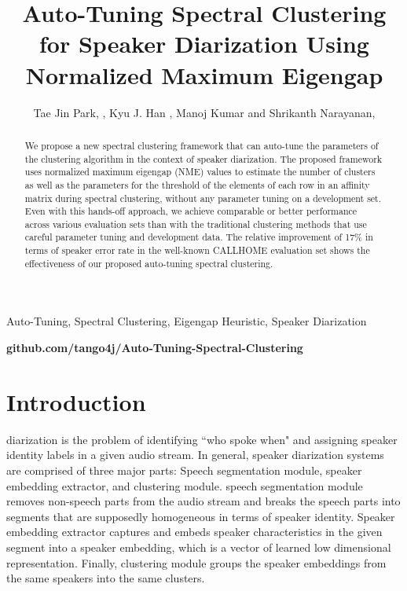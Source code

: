 \documentclass[journal]{IEEEtran}
\begin{document}
\newcommand{\tjnote}{\textcolor{red}}

\title{Auto-Tuning Spectral Clustering for Speaker Diarization Using Normalized Maximum Eigengap}
\author{Tae Jin Park, , Kyu J. Han , Manoj Kumar and Shrikanth Narayanan, }
\maketitle
\begin{abstract}
We propose a new spectral clustering framework that can auto-tune the parameters of the clustering algorithm in the context of speaker diarization. The proposed framework uses normalized maximum eigengap (NME) values to estimate the number of clusters as well as the parameters for the threshold of the elements of each row in an affinity matrix during spectral clustering, without any parameter tuning on a development set. Even with this hands-off approach, we achieve comparable or better performance across various evaluation sets than with the traditional clustering methods that use careful parameter tuning and development data. The relative improvement of 17\% in terms of speaker error rate in the well-known CALLHOME evaluation set shows the effectiveness of our proposed auto-tuning spectral clustering. 

\end{abstract}

\begin{IEEEkeywords} Auto-Tuning, Spectral Clustering, Eigengap Heuristic, Speaker Diarization

\end{IEEEkeywords}
\textbf{github.com/tango4j/Auto-Tuning-Spectral-Clustering}


\IEEEpeerreviewmaketitle
\vspace{-1ex}
\section{Introduction}

 diarization is the problem of identifying ``who spoke when" and assigning speaker identity labels in a given audio stream. In general, speaker diarization systems are comprised of three major parts: Speech segmentation module, speaker embedding extractor, and clustering module. speech segmentation module removes non-speech parts from the audio stream and breaks the speech parts into segments that are supposedly homogeneous in terms of speaker identity. Speaker embedding extractor captures and embeds speaker characteristics in the given segment into a speaker embedding, which is a vector of learned low dimensional representation. Finally, clustering module groups the speaker embeddings from the same speakers into the same clusters.  
\end{document}
